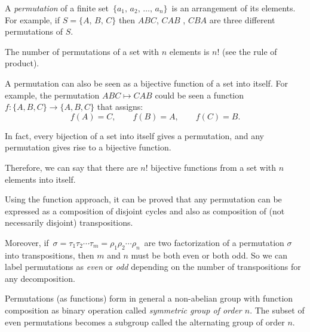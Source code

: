 \documentclass[12pt]{article}
\begin{document}
A \emph{permutation} of a finite set \,$\{a_1,\,a_2,\,\ldots,\,a_n\}$\, is an arrangement of its elements.
For example, if $S=\{A,\,B,\,C\}$ then $A B C$, $C A B$ , $C B A$ are three different permutations of $S$.

The number of permutations of a set with $n$ elements is $n!$ (see the rule of product).

A permutation can also be seen as a bijective function of a set into itself.
For example, the permutation $A B C \mapsto C A B$ could be seen a function $f:\{A,B,C\} \to \{A,B,C\}$ that assigns:
$$f(A)=C,\qquad f(B)=A,\qquad f(C)=B.$$

In fact, every bijection of a set into itself gives a permutation, and any permutation gives rise to  a bijective function.

Therefore, we can say that there are $n!$ bijective functions from a set with $n$ elements into itself.


Using the function approach, it can be proved that any permutation can be expressed as a composition of disjoint cycles and also as composition of (not necessarily disjoint) transpositions.

Moreover, if\, $\sigma=\tau_1\tau_2\cdots\tau_m=\rho_1\rho_2\cdots\rho_n$\, are two factorization of a permutation $\sigma$ into transpositions, then $m$ and $n$ must be both even or both odd. So we can label permutations as \emph{even} or \emph{odd} depending on the number of transpositions for any decomposition.

Permutations (as functions) form in general a non-abelian group with function composition as binary operation called \emph{symmetric group of order $n$}. The subset of even permutations becomes a subgroup called the alternating group of order $n$.
\end{document}
